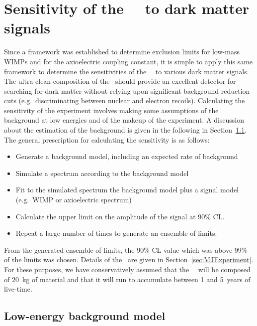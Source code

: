 	\section{Sensitivity of the \MJ~\minmod~to dark matter signals}
	\label{sec:MJSensitivity}
	
	Since a framework was established to determine exclusion limits for low-mass WIMPs and for the axioelectric coupling constant, it is simple to apply this same framework to determine the sensitivities of the \MJ~\minmod~to various dark matter signals.  The ultra-clean composition of the \minmod~should provide an excellent detector for searching for dark matter without relying upon significant background reduction cuts (e.g.~discriminating between nuclear and electron recoils).  Calculating the sensitivity of the experiment involves making some assumptions of the background at low energies and of the makeup of the experiment.  A discussion about the estimation of the background is given in the following in Section~\ref{sec:MJLowEnergyBackgroundModel}.  The general prescription for calculating the sensitivity is as follows:
	
		\begin{itemize}
			\item Generate a background model, including an expected rate of background
			\item Simulate a spectrum according to the background model
			\item Fit to the simulated spectrum the background model plus a signal model (e.g.~WIMP or axioelectric spectrum)
			\item Calculate the upper limit on the amplitude of the signal at 90\% CL.
			\item Repeat a large number of times to generate an ensemble of limits.
		\end{itemize}	
From the generated ensemble of limits, the 90\% CL value which was above 99\% of the limits was chosen.  Details of the \MJ~\minmod are given in Section~\ref{sec:MJExperiment}.  For these purposes, we have conservatively assumed that the \MJ~\minmod~will be composed of 20~kg of material and that it will run to accumulate between 1 and 5~years of live-time.  
	
		\subsection{Low-energy background model}
		\label{sec:MJLowEnergyBackgroundModel}
		
